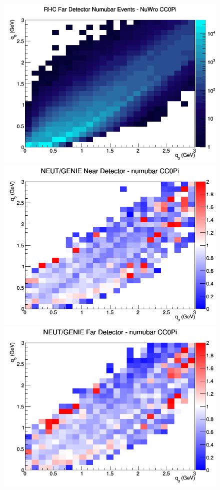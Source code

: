 \begin{figure}[h]
\endminipage
{}
\includegraphics[width=\linewidth]{eff_q0_q3/GAr/CC0Pi_RHC_FD_numubar_q3_q0_NuWro.png}
\endminipage
\newline
{}
\includegraphics[width=\linewidth]{eff_q0_q3/GAr/ratios/CC0Pi_NEUT_GENIE_numubar_near_q3_q0.png}
\endminipage
{}
\includegraphics[width=\linewidth]{eff_q0_q3/GAr/ratios/CC0Pi_NEUT_GENIE_numubar_far_q3_q0.png}

\end{figure}

